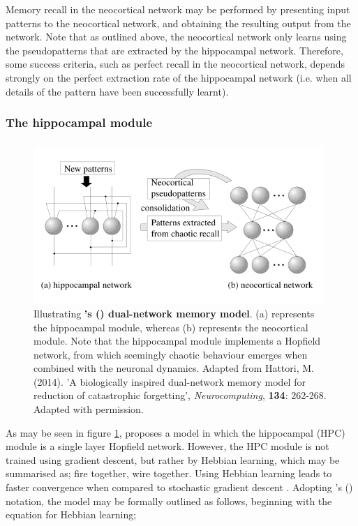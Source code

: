 Memory recall in the neocortical network may be performed by presenting input patterns to the neocortical network, and obtaining the resulting output from the network. Note that as outlined above, the neocortical network only learns using the pseudopatterns that are extracted by the hippocampal network. Therefore, some success criteria, such as perfect recall in the neocortical network, depends strongly on the perfect extraction rate of the hippocampal network (i.e. when all details of the pattern have been successfully learnt).

\subsubsection{The hippocampal module}
\subsubsection{\cite{Hattori2010}}
\begin{figure}
\centering
\includegraphics[width=11cm]{fig/hattori2010_model_structure}
\caption{Illustrating \textbf{\citeauthor{Hattori2010}'s (\citeyear{Hattori2010}) dual-network memory model}. (a) represents the hippocampal module, whereas (b) represents the neocortical module. Note that the hippocampal module implements a Hopfield network, from which seemingly chaotic behaviour emerges when combined with the neuronal dynamics. Adapted from Hattori, M. (2014). 'A biologically inspired dual-network memory model for reduction of catastrophic forgetting', \textit{Neurocomputing}, \textbf{134}: 262-268. Adapted with permission.}
\label{fig:hattori2010_model_structure}
\end{figure}

As may be seen in figure \ref{fig:hattori2010_model_structure}, \cite{Hattori2010} proposes a model in which the hippocampal (HPC) module is a single layer Hopfield network. However, the HPC module is not trained using gradient descent, but rather by Hebbian learning, which may be summarised as; fire together, wire together. Using Hebbian learning leads to faster convergence when compared to stochastic gradient descent \citep{Hattori2010}. Adopting \citeauthor{Hattori2010}'s (\citeyear{Hattori2010}) notation, the model may be formally outlined as follows, beginning with the equation for Hebbian learning;

